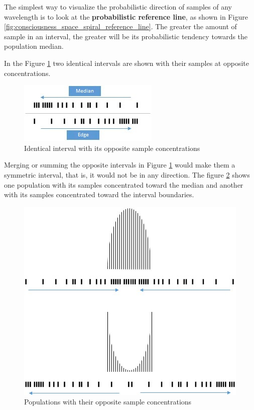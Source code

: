 The simplest way to visualize the probabilistic direction of samples of any wavelength is to look at the \textbf{probabilistic reference line}, as shown in Figure \ref{fig:consciousness_space_spiral_reference_line}. The greater the amount of sample in an interval, the greater will be its probabilistic tendency towards the population median.

In the Figure \ref{fig:consciousness_concentration_of_opposite_samples} two identical intervals are shown with their samples at opposite concentrations.
	\begin{figure}[H]
	\caption{Identical interval with its opposite sample concentrations}
	\label{fig:consciousness_concentration_of_opposite_samples}
	\centering
	\includegraphics[scale=1.2]{sections/images/consciousness_concentration_of_opposite_samples.jpg}
	\end{figure}

Merging or summing the opposite intervals in Figure \ref{fig:consciousness_concentration_of_opposite_samples} would make them a symmetric interval, that is, it would not be in any direction.
The figure \ref{fig:consciousness_concentration_of_opposite_samples_within_range} shows one population with its samples concentrated toward the median and another with its samples concentrated toward the interval boundaries.
	\begin{figure}[H]
	\caption{Populations with their opposite sample concentrations}
	\label{fig:consciousness_concentration_of_opposite_samples_within_range}
	\centering
	\includegraphics[scale=.7]{sections/images/consciousness_concentration_of_opposite_samples_within_range.jpg}
	\end{figure}

